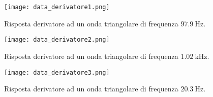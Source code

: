 \begin{figure}
	\centering
	\texttt{[image: data\_derivatore1.png]}
	\caption{Risposta derivatore ad un onda triangolare di frequenza $\SI{97.9}{\Hz}$.}
	\label{f:deriv1}
\end{figure}

\begin{figure}
	\centering
	\texttt{[image: data\_derivatore2.png]}
	\caption{Risposta derivatore ad un onda triangolare di frequenza $\SI{1.02}{\kHz}$.}
	\label{f:deriv2}
\end{figure}	

\begin{figure}
	\centering
	\texttt{[image: data\_derivatore3.png]}
	\caption{Risposta derivatore ad un onda triangolare di frequenza $\SI{20.3}{\Hz}$.}
	\label{f:deriv3}
\end{figure}